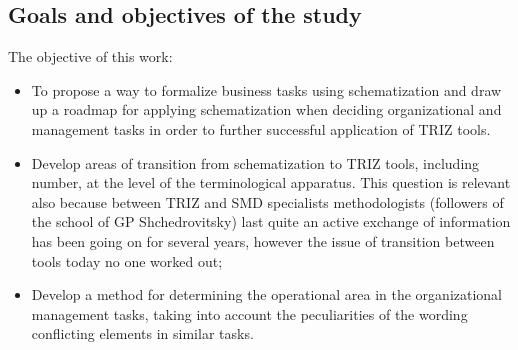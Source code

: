 \subsection{Goals and objectives of the study}
The objective of this work:
\begin{itemize}
\item To propose a way to formalize business tasks using schematization and
  draw up a roadmap for applying schematization when deciding organizational
  and management tasks in order to further successful application of TRIZ
  tools.
\item Develop areas of transition from schematization to TRIZ tools, including
  number, at the level of the terminological apparatus. This question is
  relevant also because between TRIZ and SMD specialists methodologists
  (followers of the school of GP Shchedrovitsky) last quite an active exchange
  of information has been going on for several years, however the issue of
  transition between tools today no one worked out;
\item Develop a method for determining the operational area in the
  organizational management tasks, taking into account the peculiarities of
  the wording conflicting elements in similar tasks.
\end{itemize}
